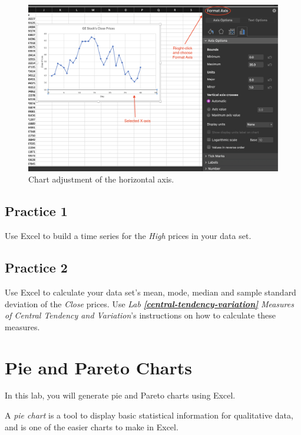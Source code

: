 \documentclass[
  12pt,
  letterpaper,
]{book}
\begin{document}
\begin{figure}

{\centering \includegraphics[width=0.8\linewidth]{images/adjust-axis} 

}

\caption{Chart adjustment of the horizontal axis.}\label{fig:adjust-axis}
\end{figure}

\hypertarget{practice-1-3}{%
\section{Practice 1}\label{practice-1-3}}

Use Excel to build a time series for the \emph{High} prices in your data set.

\hypertarget{practice-2-3}{%
\section{Practice 2}\label{practice-2-3}}

Use Excel to calculate your data set's mean, mode, median and sample standard deviation of the \emph{Close} prices. Use \emph{Lab} \textbf{\emph{\ref{central-tendency-variation}}} \emph{Measures of Central Tendency and Variation}'s instructions on how to calculate these measures.

\hypertarget{pie-and-pareto-charts}{%
\chapter{Pie and Pareto Charts}\label{pie-and-pareto-charts}}

In this lab, you will generate pie and Pareto charts using Excel.

A \emph{pie chart} is a tool to display basic statistical information for qualitative data, and is one of the easier charts to make in Excel.
\end{document}
